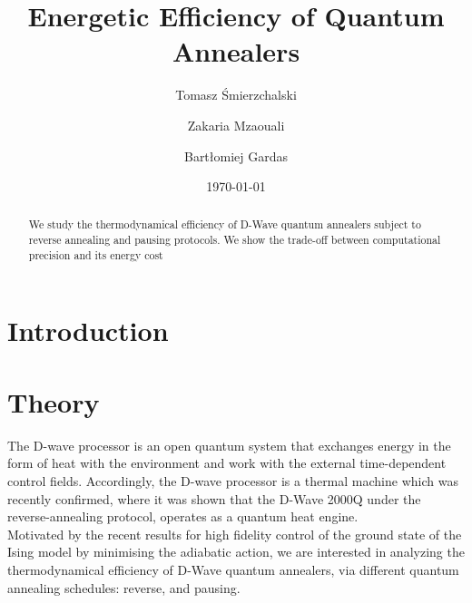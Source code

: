 \documentclass[%
 reprint,
 amsmath,amssymb,
 aps,
]{revtex4-2}
\begin{document}

\title{Energetic Efficiency of Quantum Annealers}%

\author{Tomasz Śmierzchalski}
\author{Zakaria Mzaouali}%
 \author{Bartłomiej Gardas}

\date{\today}%

\begin{abstract}
We study the thermodynamical efficiency of D-Wave quantum annealers subject to reverse annealing and pausing protocols. We show the trade-off between computational precision and its energy cost

\end{abstract}

\maketitle

\section{\label{intro} Introduction}

\section{\label{theory} Theory}
The D-wave processor is an open quantum system that exchanges energy in the form of heat with the environment and work with the external time-dependent control fields. Accordingly, the D-wave processor is a thermal machine which was recently confirmed,  where it was shown that the D-Wave 2000Q under the reverse-annealing protocol, operates as a quantum heat engine.  \\
Motivated by the recent results for high fidelity control of the ground state of the Ising model by minimising the adiabatic action, we are interested in analyzing the thermodynamical efficiency of D-Wave quantum annealers, via different quantum annealing schedules: reverse, and pausing. 
\end{document}
